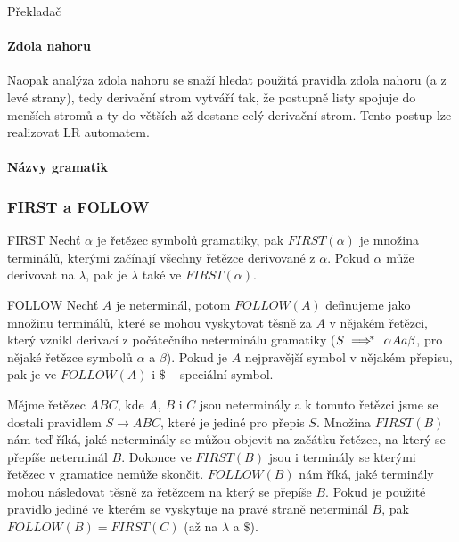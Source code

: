 \begin{definiceN}{Překladač}
\paragraph{Zdola nahoru} Naopak analýza zdola nahoru se snaží hledat použitá pravidla zdola nahoru (a z levé strany), tedy derivační strom vytváří tak, že postupně listy spojuje do menších stromů a ty do větších až dostane celý derivační strom. Tento postup lze realizovat LR automatem. 

\paragraph{Názvy gramatik} 


\subsubsection{FIRST a FOLLOW}

\begin{definiceN}{FIRST}
	Nechť \(\alpha\) je řetězec symbolů gramatiky, pak \(FIRST(\alpha)\) je množina terminálů, kterými začínají všechny řetězce derivované z \(\alpha\). Pokud \(\alpha\) může derivovat na \(\lambda\), pak je \(\lambda\) také ve \(FIRST(\alpha)\).
\end{definiceN}

\begin{definiceN}{FOLLOW}
	Nechť \(A\) je neterminál, potom \(FOLLOW(A)\) definujeme jako množinu terminálů, které se mohou vyskytovat těsně za \(A\) v nějakém řetězci, který vznikl derivací z počátečního neterminálu gramatiky (\(S \implies \hskip -0.7em ^* \hskip 0.7em \alpha A a \beta\), pro nějaké řetězce symbolů \(\alpha\) a \(\beta\)). Pokud je \(A\) nejpravější symbol v nějakém přepisu, pak je ve \(FOLLOW(A)\) i \(\$\) -- speciální symbol.
\end{definiceN}

\begin{priklad}
	Mějme řetězec \(ABC\), kde \(A\), \(B\) i \(C\) jsou neterminály a k tomuto řetězci jsme se dostali pravidlem \(S \to ABC\), které je jediné pro přepis \(S\). Množina \(FIRST(B)\) nám teď říká, jaké neterminály se můžou objevit na začátku řetězce, na který se přepíše neterminál \(B\). Dokonce ve \(FIRST(B)\) jsou i terminály se kterými řetězec v gramatice nemůže skončit. \(FOLLOW(B)\) nám říká, jaké terminály mohou následovat těsně za řetězcem na který se přepíše \(B\). Pokud je použité pravidlo jediné ve kterém se vyskytuje na pravé straně neterminál \(B\), pak \(FOLLOW(B) = FIRST(C)\) (až na \(\lambda\) a \(\$\)).
\end{priklad}


\end{definiceN}
